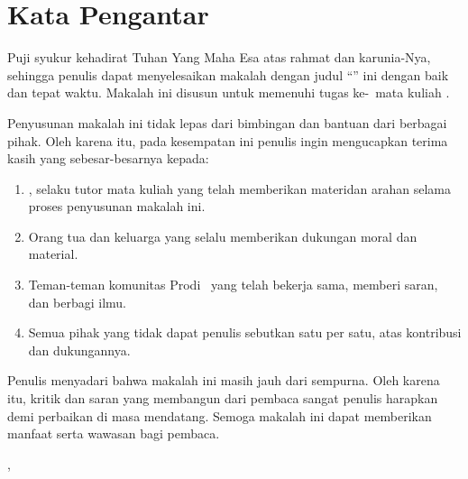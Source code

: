 \chapter*{Kata Pengantar}


Puji syukur kehadirat Tuhan Yang Maha Esa atas rahmat dan karunia-Nya, sehingga penulis dapat menyelesaikan makalah dengan judul ``\judul'' ini dengan baik dan tepat waktu. Makalah ini disusun untuk memenuhi tugas ke-\tugasKe\ mata kuliah \namaMataKuliah.

Penyusunan makalah ini tidak lepas dari bimbingan dan bantuan dari berbagai pihak. Oleh karena itu, pada kesempatan ini penulis ingin mengucapkan terima kasih yang sebesar-besarnya kepada:

\begin{enumerate}[]
    \item \namaTutorPengampu, selaku tutor mata kuliah \namaMataKuliah yang telah memberikan materidan arahan selama proses penyusunan makalah ini.
    \item Orang tua dan keluarga yang selalu memberikan dukungan moral dan material.
    \item Teman-teman komunitas Prodi \programStudi\  yang telah bekerja sama,  memberi saran, dan berbagi ilmu.
    \item Semua pihak yang tidak dapat penulis sebutkan satu per satu, atas kontribusi dan dukungannya.
\end{enumerate}

Penulis menyadari bahwa makalah ini masih jauh dari sempurna. Oleh karena itu, kritik dan saran yang membangun dari pembaca sangat penulis harapkan demi perbaikan di masa mendatang. Semoga makalah ini dapat memberikan manfaat serta wawasan bagi pembaca.

\vfill
\hfill \daearhMahasiswa, \tanggalLengkap


\hfill \namaMahasiswa
\vfill